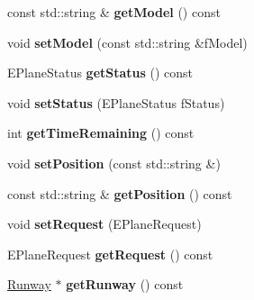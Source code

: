 \begin{DoxyCompactItemize}
\item 
const std\+::string \& {\bfseries get\+Model} () const \hypertarget{classAirplane_ab3086ab630a7e427df70c7b45f11dd82}{}\label{classAirplane_ab3086ab630a7e427df70c7b45f11dd82}

\item 
void {\bfseries set\+Model} (const std\+::string \&f\+Model)\hypertarget{classAirplane_a1c802997a57f1f9ff1dcca87a900de57}{}\label{classAirplane_a1c802997a57f1f9ff1dcca87a900de57}

\item 
E\+Plane\+Status {\bfseries get\+Status} () const \hypertarget{classAirplane_a40bbb3024a476115700977c60bae2705}{}\label{classAirplane_a40bbb3024a476115700977c60bae2705}

\item 
void {\bfseries set\+Status} (E\+Plane\+Status f\+Status)\hypertarget{classAirplane_a23934fb97d8fab12d4dc790cee673747}{}\label{classAirplane_a23934fb97d8fab12d4dc790cee673747}

\item 
int {\bfseries get\+Time\+Remaining} () const \hypertarget{classAirplane_a39233c86a764ac1051ce4b4460a9a684}{}\label{classAirplane_a39233c86a764ac1051ce4b4460a9a684}

\item 
void {\bfseries set\+Position} (const std\+::string \&)\hypertarget{classAirplane_a9faa470c892f7a3ca82ca75efd31be16}{}\label{classAirplane_a9faa470c892f7a3ca82ca75efd31be16}

\item 
const std\+::string \& {\bfseries get\+Position} () const \hypertarget{classAirplane_ab4fa66c0adb05725a51524265f8c520c}{}\label{classAirplane_ab4fa66c0adb05725a51524265f8c520c}

\item 
void {\bfseries set\+Request} (E\+Plane\+Request)\hypertarget{classAirplane_affcc5325670824881ccc1524223aa209}{}\label{classAirplane_affcc5325670824881ccc1524223aa209}

\item 
E\+Plane\+Request {\bfseries get\+Request} () const \hypertarget{classAirplane_afe210aea9002a8975234a78350158c46}{}\label{classAirplane_afe210aea9002a8975234a78350158c46}

\item 
\hyperlink{classRunway}{Runway} $\ast$ {\bfseries get\+Runway} () const \hypertarget{classAirplane_ab6dda72f7cfd29a7334e0494d184bbfa}{}\label{classAirplane_ab6dda72f7cfd29a7334e0494d184bbfa}


\end{DoxyCompactItemize}
